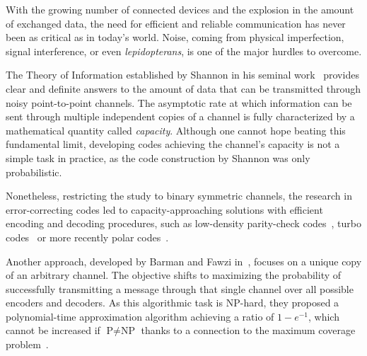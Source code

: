 
With the growing number of connected devices and the explosion in the amount of exchanged data, the need for efficient and reliable communication has never been as critical as in today's world. Noise, coming from physical imperfection, signal interference, or even \emph{lepidopterans}, is one of the major hurdles to overcome.

The Theory of Information established by Shannon in his seminal work~\cite{Shannon48} provides clear and definite answers to the amount of data that can be transmitted through noisy point-to-point channels. The asymptotic rate at which information can be sent through multiple independent copies of a channel is fully characterized by a mathematical quantity called \emph{capacity}. Although one cannot hope beating this fundamental limit, developing codes achieving the channel's capacity is not a simple task in practice, as the code construction by Shannon was only probabilistic.

Nonetheless, restricting the study to binary symmetric channels, the research in error-correcting codes led to capacity-approaching solutions with efficient encoding and decoding procedures, such as low-density parity-check codes~\cite{Gallager62}, turbo codes~\cite{BG96} or more recently polar codes~\cite{Arikan09}.

Another approach, developed by Barman and Fawzi in~\cite{BF18}, focuses on a unique copy of an arbitrary channel. The objective shifts to maximizing the probability of successfully transmitting a message through that single channel over all possible encoders and decoders. As this algorithmic task is \textrm{NP}-hard, they proposed a polynomial-time approximation algorithm achieving a ratio of $1-e^{-1}$, which cannot be increased if $\textrm{P}\not=\textrm{NP}$ thanks to a connection to the maximum coverage problem~\cite{Feige02}.

